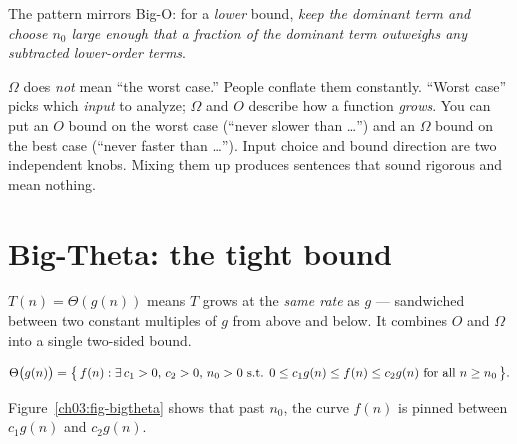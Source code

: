 The pattern mirrors Big-O: for a \emph{lower} bound, \emph{keep the dominant term and
choose $n_0$ large enough that a fraction of the dominant term outweighs any subtracted
lower-order terms}.

\begin{trapbox}
$\Omega$ does \emph{not} mean ``the worst case.'' People conflate them constantly.
``Worst case'' picks which \emph{input} to analyze; $\Omega$ and $O$ describe how a
function \emph{grows}. You can put an $O$ bound on the worst case (``never slower
than \dots'') and an $\Omega$ bound on the best case (``never faster than \dots'').
Input choice and bound direction are two independent knobs. Mixing them up produces
sentences that sound rigorous and mean nothing.
\end{trapbox}

\section{Big-Theta: the tight bound}

$T(n) = \Theta(g(n))$ means $T$ grows at the \emph{same rate} as $g$ ---
sandwiched between two constant multiples of $g$ from above and below. It combines $O$
and $\Omega$ into a single two-sided bound.

\begin{formalbox}
\begin{definition}\label{ch03:def-bigtheta}
\[
  \Theta\bigl(g(n)\bigr) = \set[\big]{\, f(n) : \exists\, c_1>0,\, c_2>0,\, n_0>0
  \text{ s.t. } 0 \le c_1 g(n) \le f(n) \le c_2 g(n) \text{ for all } n \ge n_0 \,}.
\]
\end{definition}
\end{formalbox}

Figure~\ref{ch03:fig-bigtheta} shows that past $n_0$, the curve $f(n)$ is pinned between $c_1 g(n)$ and $c_2 g(n)$.

